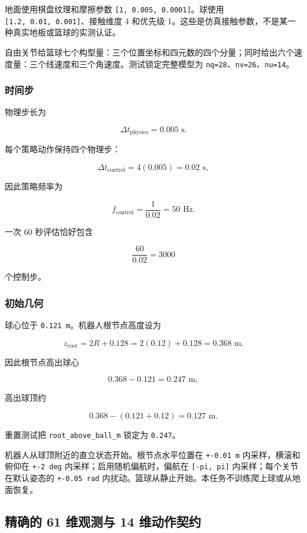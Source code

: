 \documentclass[
  chinese,
  11pt,
  letterpaper,
]{article}
\begin{document}
地面使用棋盘纹理和摩擦参数 \texttt{{[}1,\ 0.005,\ 0.0001{]}}。球使用
\texttt{{[}1.2,\ 0.01,\ 0.001{]}}、接触维度 4 和优先级
1。这些是仿真接触参数，不是某一种真实地板或篮球的实测认证。

自由关节给篮球七个构型量：三个位置坐标和四元数的四个分量；同时给出六个速度量：三个线速度和三个角速度。测试锁定完整模型为
\texttt{nq=28}、\texttt{nv=26}、\texttt{nu=14}。

\subsubsection{时间步}\label{ux65f6ux95f4ux6b65}

物理步长为

\[
\Delta t_{\text{physics}}=0.005\text{ s}.
\]

每个策略动作保持四个物理步：

\[
\Delta t_{\text{control}}
=4(0.005)
=0.02\text{ s},
\]

因此策略频率为

\[
f_{\text{control}}=\frac{1}{0.02}=50\text{ Hz}.
\]

一次 60 秒评估恰好包含

\[
\frac{60}{0.02}=3000
\]

个控制步。

\subsubsection{初始几何}\label{ux521dux59cbux51e0ux4f55}

球心位于 \texttt{0.121\ m}。机器人根节点高度设为

\[
z_{\text{root}}
=2R+0.128
=2(0.12)+0.128
=0.368\text{ m}.
\]

因此根节点高出球心

\[
0.368-0.121=0.247\text{ m},
\]

高出球顶约

\[
0.368-(0.121+0.12)=0.127\text{ m}.
\]

重置测试把
\texttt{root\_\allowbreak{}above\_\allowbreak{}ball\_\allowbreak{}m}
锁定为 \texttt{0.247}。

机器人从球顶附近的直立状态开始。根节点水平位置在 \texttt{+-0.01\ m}
内采样，横滚和俯仰在 \texttt{+-2\ deg} 内采样；启用随机偏航时，偏航在
\texttt{{[}-pi,\ pi{]}} 内采样；每个关节在默认姿态的
\texttt{+-0.05\ rad}
内扰动。篮球从静止开始。本任务不训练爬上球或从地面恢复。

\subsection{精确的 61 维观测与 14
维动作契约}\label{ux7cbeux786eux7684-61-ux7ef4ux89c2ux6d4bux4e0e-14-ux7ef4ux52a8ux4f5cux5951ux7ea6}
\end{document}
